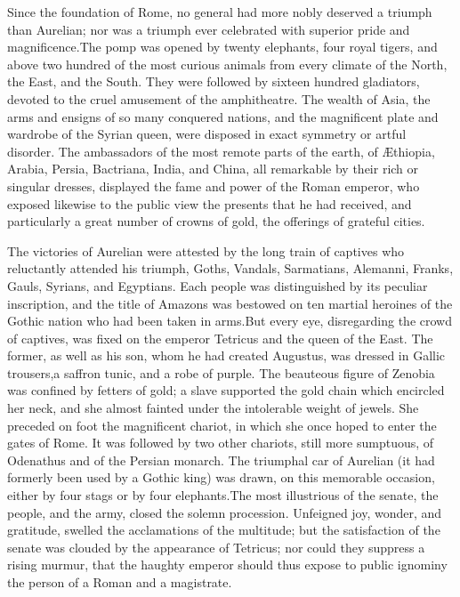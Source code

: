
Since the foundation of Rome, no general had more nobly deserved
a triumph than Aurelian; nor was a triumph ever celebrated with
superior pride and magnificence.\footnotemark[77] The pomp was opened by twenty
elephants, four royal tigers, and above two hundred of the most
curious animals from every climate of the North, the East, and
the South. They were followed by sixteen hundred gladiators,
devoted to the cruel amusement of the amphitheatre. The wealth of
Asia, the arms and ensigns of so many conquered nations, and the
magnificent plate and wardrobe of the Syrian queen, were disposed
in exact symmetry or artful disorder. The ambassadors of the most
remote parts of the earth, of Æthiopia, Arabia, Persia,
Bactriana, India, and China, all remarkable by their rich or
singular dresses, displayed the fame and power of the Roman
emperor, who exposed likewise to the public view the presents
that he had received, and particularly a great number of crowns
of gold, the offerings of grateful cities.

The victories of Aurelian were attested by the long train of
captives who reluctantly attended his triumph, Goths, Vandals,
Sarmatians, Alemanni, Franks, Gauls, Syrians, and Egyptians. Each
people was distinguished by its peculiar inscription, and the
title of Amazons was bestowed on ten martial heroines of the
Gothic nation who had been taken in arms.\footnotemark[78] But every eye,
disregarding the crowd of captives, was fixed on the emperor
Tetricus and the queen of the East. The former, as well as his
son, whom he had created Augustus, was dressed in Gallic
trousers,\footnotemark[79] a saffron tunic, and a robe of purple. The beauteous
figure of Zenobia was confined by fetters of gold; a slave
supported the gold chain which encircled her neck, and she almost
fainted under the intolerable weight of jewels. She preceded on
foot the magnificent chariot, in which she once hoped to enter
the gates of Rome. It was followed by two other chariots, still
more sumptuous, of Odenathus and of the Persian monarch. The
triumphal car of Aurelian (it had formerly been used by a Gothic
king) was drawn, on this memorable occasion, either by four stags
or by four elephants.\footnotemark[80] The most illustrious of the senate, the
people, and the army, closed the solemn procession. Unfeigned
joy, wonder, and gratitude, swelled the acclamations of the
multitude; but the satisfaction of the senate was clouded by the
appearance of Tetricus; nor could they suppress a rising murmur,
that the haughty emperor should thus expose to public ignominy
the person of a Roman and a magistrate.\footnotemark[81]

